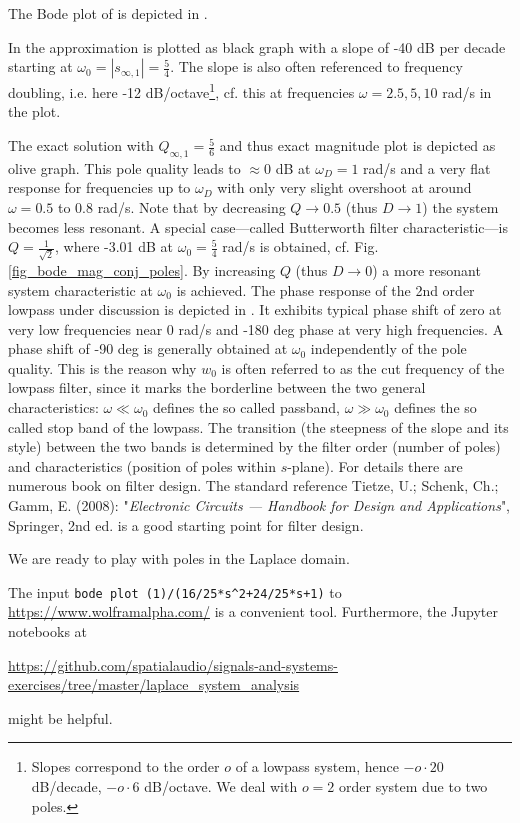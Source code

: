 \begin{Loesung}
The Bode plot of  is depicted in
.


%
In  the approximation is plotted as
black graph with a slope of -40 dB per decade starting at
$\omega_0 = |s_{\infty,1}|=\frac{5}{4}$.
The slope is also often referenced to frequency doubling, i.e. here
-12 dB/octave\footnote{Slopes correspond to the order $o$ of a lowpass system,
hence $-o\cdot 20$ dB/decade, $-o\cdot 6$ dB/octave.
We deal with $o=2$ order system due to two poles.},
cf. this at frequencies $\omega=2.5, 5, 10$ rad/s in the plot.

The exact solution with $Q_{\infty,1}=\frac{5}{6}$ and thus exact magnitude plot
is depicted as olive graph. This pole quality leads to $\approx 0$ dB at
$\omega_D=1$ rad/s and a very flat response for frequencies up to $\omega_D$
with only very slight overshoot at around $\omega = 0.5$ to $0.8$ rad/s.
Note that by decreasing $Q\rightarrow 0.5$ (thus $D\rightarrow 1$)
the system becomes less resonant.
A special case---called Butterworth filter characteristic---is
$Q = \frac{1}{\sqrt{2}}$, where -3.01 dB at $\omega_0 = \frac{5}{4}$ rad/s is
obtained, cf. Fig. \ref{fig_bode_mag_conj_poles}.
By increasing $Q$ (thus $D\rightarrow 0$) a more resonant system characteristic at $\omega_0$ is achieved.
%
The phase response of the 2nd order lowpass under discussion is depicted
in .
It exhibits typical phase shift of zero at very low frequencies near 0 rad/s and -180 deg phase at very high frequencies.
A phase shift of -90 deg is generally obtained at $\omega_0$ independently of
the pole quality.
This is the reason why $w_0$ is often referred to as the cut frequency
of the lowpass filter, since it marks the borderline between the two general
characteristics: $\omega \ll \omega_0$ defines the so called passband,
$\omega \gg \omega_0$ defines the so called stop band of the lowpass.
The transition
(the steepness of the slope and its style) between the two bands is
determined by the filter order (number of poles) and characteristics (position of poles within $s$-plane).
For details there are numerous book on filter design. The standard reference Tietze, U.; Schenk, Ch.; Gamm, E. (2008): "\textit{Electronic Circuits --- Handbook for Design and Applications}", Springer, 2nd ed. is a good starting point for filter design.

We are ready to play with poles in the Laplace domain.

The
input \verb|bode plot (1)/(16/25*s^2+24/25*s+1)|
to
\url{https://www.wolframalpha.com/}
is a convenient tool. Furthermore, the Jupyter notebooks
at

\url{https://github.com/spatialaudio/signals-and-systems-exercises/tree/master/laplace_system_analysis}

might be helpful.
\end{Loesung}

